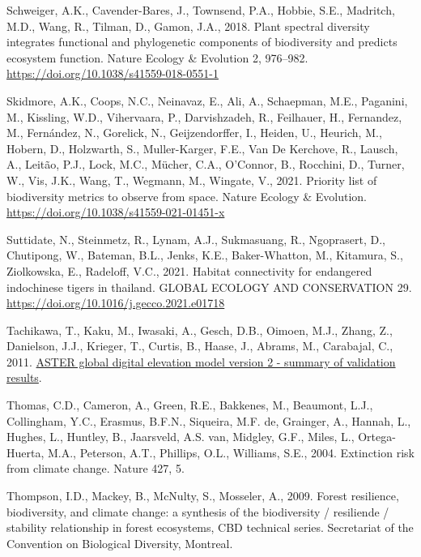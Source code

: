 \documentclass[
]{agujournal2019}
\newlength{\cslhangindent}
\newenvironment{CSLReferences}[2] %
 {\begin{list}{}{%
  \setlength{\itemindent}{0pt}
  \setlength{\leftmargin}{0pt}
  \setlength{\parsep}{0pt}
  \ifodd #1
   \setlength{\leftmargin}{\cslhangindent}
   \setlength{\itemindent}{-1\cslhangindent}
  \fi
  \setlength{\itemsep}{#2\baselineskip}}}
 {\end{list}}
\begin{document}
\begin{CSLReferences}{1}{0}
Schweiger, A.K., Cavender-Bares, J., Townsend, P.A., Hobbie, S.E.,
Madritch, M.D., Wang, R., Tilman, D., Gamon, J.A., 2018. Plant spectral
diversity integrates functional and phylogenetic components of
biodiversity and predicts ecosystem function. Nature Ecology \&
Evolution 2, 976--982. \url{https://doi.org/10.1038/s41559-018-0551-1}

Skidmore, A.K., Coops, N.C., Neinavaz, E., Ali, A., Schaepman, M.E.,
Paganini, M., Kissling, W.D., Vihervaara, P., Darvishzadeh, R.,
Feilhauer, H., Fernandez, M., Fernández, N., Gorelick, N.,
Geijzendorffer, I., Heiden, U., Heurich, M., Hobern, D., Holzwarth, S.,
Muller-Karger, F.E., Van De Kerchove, R., Lausch, A., Leitão, P.J.,
Lock, M.C., Mücher, C.A., O'Connor, B., Rocchini, D., Turner, W., Vis,
J.K., Wang, T., Wegmann, M., Wingate, V., 2021. Priority list of
biodiversity metrics to observe from space. Nature Ecology \& Evolution.
\url{https://doi.org/10.1038/s41559-021-01451-x}

Suttidate, N., Steinmetz, R., Lynam, A.J., Sukmasuang, R., Ngoprasert,
D., Chutipong, W., Bateman, B.L., Jenks, K.E., Baker-Whatton, M.,
Kitamura, S., Ziolkowska, E., Radeloff, V.C., 2021. Habitat connectivity
for endangered indochinese tigers in thailand. GLOBAL ECOLOGY AND
CONSERVATION 29. \url{https://doi.org/10.1016/j.gecco.2021.e01718}

Tachikawa, T., Kaku, M., Iwasaki, A., Gesch, D.B., Oimoen, M.J., Zhang,
Z., Danielson, J.J., Krieger, T., Curtis, B., Haase, J., Abrams, M.,
Carabajal, C., 2011.
\href{http://pubs.er.usgs.gov/publication/70005960}{ASTER global digital
elevation model version 2 - summary of validation results}.

Thomas, C.D., Cameron, A., Green, R.E., Bakkenes, M., Beaumont, L.J.,
Collingham, Y.C., Erasmus, B.F.N., Siqueira, M.F. de, Grainger, A.,
Hannah, L., Hughes, L., Huntley, B., Jaarsveld, A.S. van, Midgley, G.F.,
Miles, L., Ortega-Huerta, M.A., Peterson, A.T., Phillips, O.L.,
Williams, S.E., 2004. Extinction risk from climate change. Nature 427,
5.

Thompson, I.D., Mackey, B., McNulty, S., Mosseler, A., 2009. Forest
resilience, biodiversity, and climate change: a synthesis of the
biodiversity / resiliende / stability relationship in forest ecosystems,
CBD technical series. Secretariat of the Convention on Biological
Diversity, Montreal.


\end{CSLReferences}
\end{document}
